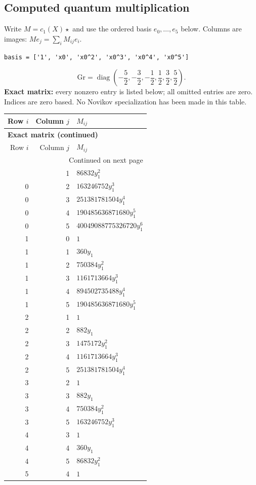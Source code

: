 \documentclass[10pt,a4paper]{article}
\begin{document}
\subsection*{Computed quantum multiplication}
Write $M=c_1(X)\star$ and use the ordered basis $e_0,\ldots,e_{5}$ below. Columns are images: $M e_j=\sum_i M_{ij}e_i$.
\begin{lstlisting}
basis = ['1', 'x0', 'x0^2', 'x0^3', 'x0^4', 'x0^5']
\end{lstlisting}
\[\mathrm{Gr}=\operatorname{diag}\!\left(- \frac{5}{2},- \frac{3}{2},- \frac{1}{2},\frac{1}{2},\frac{3}{2},\frac{5}{2}\right).\]
\textbf{Exact matrix:} every nonzero entry is listed below; all omitted entries are zero. Indices are zero based. No Novikov specialization has been made in this table.
{\small\setlength{\tabcolsep}{7pt}\begin{longtable}{rrp{125mm}}
\toprule Row $i$ & Column $j$ & $M_{ij}$\\\midrule\endfirsthead
\multicolumn{3}{l}{\textbf{Exact matrix (continued)}}\\
\toprule Row $i$ & Column $j$ & $M_{ij}$\\\midrule\endhead
\midrule\multicolumn{3}{r}{Continued on next page}\\\endfoot\bottomrule\endlastfoot
0 & 1 & $86832 y_{1}^{2}$\\
0 & 2 & $163246752 y_{1}^{3}$\\
0 & 3 & $251381781504 y_{1}^{4}$\\
0 & 4 & $190485636871680 y_{1}^{5}$\\
0 & 5 & $40049088775326720 y_{1}^{6}$\\
1 & 0 & $1$\\
1 & 1 & $360 y_{1}$\\
1 & 2 & $750384 y_{1}^{2}$\\
1 & 3 & $1161713664 y_{1}^{3}$\\
1 & 4 & $894502735488 y_{1}^{4}$\\
1 & 5 & $190485636871680 y_{1}^{5}$\\
2 & 1 & $1$\\
2 & 2 & $882 y_{1}$\\
2 & 3 & $1475172 y_{1}^{2}$\\
2 & 4 & $1161713664 y_{1}^{3}$\\
2 & 5 & $251381781504 y_{1}^{4}$\\
3 & 2 & $1$\\
3 & 3 & $882 y_{1}$\\
3 & 4 & $750384 y_{1}^{2}$\\
3 & 5 & $163246752 y_{1}^{3}$\\
4 & 3 & $1$\\
4 & 4 & $360 y_{1}$\\
4 & 5 & $86832 y_{1}^{2}$\\
5 & 4 & $1$\\
\end{longtable}}
\end{document}
